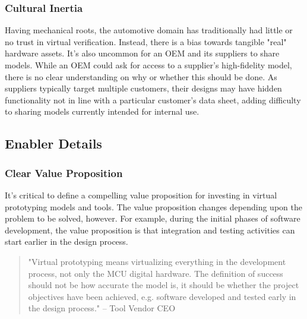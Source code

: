 \subsubsection*{Cultural Inertia}
Having mechanical roots, the automotive domain has traditionally had little or no trust in virtual verification. Instead, there is a bias towards tangible "real" hardware assets.
It's also uncommon for an OEM and its suppliers to share models.
While an OEM could ask for access to a supplier’s high-fidelity model, there is no clear understanding on why or whether this should be done.
As suppliers typically target multiple customers, their designs may have hidden functionality not in line with a particular customer’s data sheet,
adding difficulty to sharing models currently intended for internal use.



\subsection{Enabler Details}
\subsubsection*{Clear Value Proposition}
It's critical to define a compelling value proposition for investing in virtual prototyping models and tools.
The value proposition changes depending upon the problem to be solved, however.
For example, during the initial phases of software development,
the value proposition is that
integration and testing activities can start earlier in the design process.

\begin{quote}
"Virtual prototyping means virtualizing everything in the development process, not only the MCU digital hardware.
The definition of success should not be how accurate the model is,
it should be whether the project objectives have been achieved, e.g. software developed and tested early in the design process."
-- Tool Vendor CEO
\end{quote}


